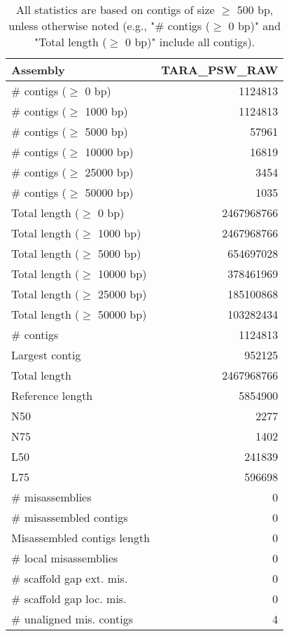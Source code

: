\documentclass[12pt,a4paper]{article}
\begin{document}
\begin{table}[ht]
\begin{center}
\caption{All statistics are based on contigs of size $\geq$ 500 bp, unless otherwise noted (e.g., "\# contigs ($\geq$ 0 bp)" and "Total length ($\geq$ 0 bp)" include all contigs).}
\begin{tabular}{|l*{1}{|r}|}
\hline
Assembly & TARA\_PSW\_RAW \\ \hline
\# contigs ($\geq$ 0 bp) & 1124813 \\ \hline
\# contigs ($\geq$ 1000 bp) & 1124813 \\ \hline
\# contigs ($\geq$ 5000 bp) & 57961 \\ \hline
\# contigs ($\geq$ 10000 bp) & 16819 \\ \hline
\# contigs ($\geq$ 25000 bp) & 3454 \\ \hline
\# contigs ($\geq$ 50000 bp) & 1035 \\ \hline
Total length ($\geq$ 0 bp) & 2467968766 \\ \hline
Total length ($\geq$ 1000 bp) & 2467968766 \\ \hline
Total length ($\geq$ 5000 bp) & 654697028 \\ \hline
Total length ($\geq$ 10000 bp) & 378461969 \\ \hline
Total length ($\geq$ 25000 bp) & 185100868 \\ \hline
Total length ($\geq$ 50000 bp) & 103282434 \\ \hline
\# contigs & 1124813 \\ \hline
Largest contig & 952125 \\ \hline
Total length & 2467968766 \\ \hline
Reference length & 5854900 \\ \hline
N50 & 2277 \\ \hline
N75 & 1402 \\ \hline
L50 & 241839 \\ \hline
L75 & 596698 \\ \hline
\# misassemblies & 0 \\ \hline
\# misassembled contigs & 0 \\ \hline
Misassembled contigs length & 0 \\ \hline
\# local misassemblies & 0 \\ \hline
\# scaffold gap ext. mis. & 0 \\ \hline
\# scaffold gap loc. mis. & 0 \\ \hline
\# unaligned mis. contigs & 4 \\ \hline

\end{tabular}
\end{center}
\end{table}
\end{document}
